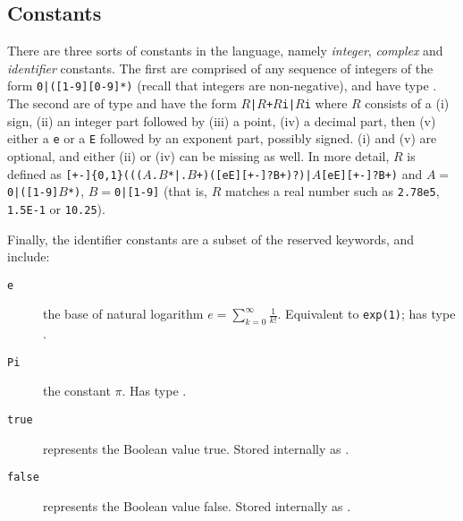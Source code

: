 \subsection{Constants}
There are three sorts of constants in the language, namely \emph{integer}, \emph{complex} and \emph{identifier} constants. The first are comprised of any sequence of integers of the form \texttt{0|([1-9][0-9]*)} (recall that integers are non-negative), and have type \integ. The second are of type \complex and have the form 
\texttt{$R$|$R$+$R$i|$R$i}
where $R$ consists of a \textsf{(i)} sign, \textsf{(ii)} an integer part followed by \textsf{(iii)} a point, \textsf{(iv)} a decimal part, then  \textsf{(v)} either a \texttt{e} or a \texttt{E} followed by an exponent part, possibly signed. \textsf{(i)} and \textsf{(v)} are optional, and either \textsf{(ii)} or \textsf{(iv)} can be missing as well. In more detail, $R$ 
is defined as \texttt{[+-]\{0,1\}((($A$.$B$*|.$B$+)([eE][+-]?B+)?)|$A$[eE][+-]?B+)} and $A=$\texttt{0|([1-9]$B$*)}, $B=$\texttt{0|[1-9]} (that is, $R$ matches a real number such as \texttt{2.78e5}, \texttt{1.5E-1} or \texttt{10.25}).

\noindent Finally, the identifier constants are a subset of the reserved keywords, and include:
\begin{description}
  \item[\texttt{e}] the base of natural logarithm $e=\sum_{k=0}^\infty \frac{1}{k!}$. Equivalent to \texttt{exp(1)}; has type \complex.
  \item[\texttt{Pi}] the constant $\pi$. Has type \complex.
  \item[\texttt{true}] represents the Boolean value \textsf{true}. Stored internally  as .
  \item[\texttt{false}] represents the Boolean value \textsf{false}. Stored internally  as .
\end{description}
